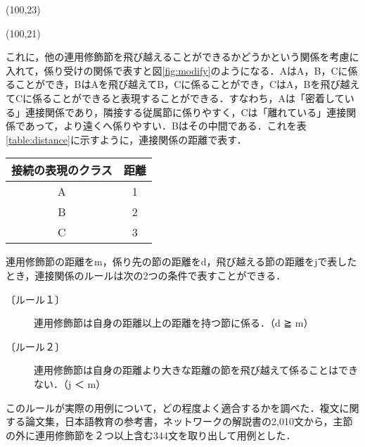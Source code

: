 \begin{figure*}
\hspace*{22mm}
\vspace*{-3mm}
\atari(100,23)
\vspace*{-3mm}
\caption{連用修飾節の包含関係}
\label{fig:imply}
\end{figure*}

\begin{figure*}
\hspace*{22mm}
\vspace*{-3mm}
\atari(100,21)
\vspace*{-3mm}
\caption{連用修飾節の係り受け}
\label{fig:modify}
\end{figure*}

これに，他の連用修飾節を飛び越えることができるかどうかという関係を考慮に入れて，係り受けの関係で表すと図\ref{fig:modify}のようになる．AはA，B，Cに係ることができ，BはAを飛び越えてB，Cに係ることができ，CはA，Bを飛び越えてCに係ることができると表現することができる．すなわち，Aは「密着している」連接関係であり，隣接する従属節に係りやすく，Cは「離れている」連接関係であって，より遠くへ係りやすい．Bはその中間である．これを表\ref{table:distance}に示すように，連接関係の距離で表す．

\begin{table*}
\caption{連接関係の距離}
\label{table:distance}
\hspace*{47mm}
\begin{tabular}{|c|c|}
\hline
\multicolumn{1}{|c|}{接続の表現のクラス} & \multicolumn{1}{c|}{距離} \\
\hline
A & 1 \\
B & 2 \\
C & 3 \\
\hline
\end{tabular}
\end{table*}
連用修飾節の距離をm，係り先の節の距離をd，飛び越える節の距離をjで表したとき，連接関係のルールは次の2つの条件で表すことができる．

\begin{description}
\item[〔ルール１〕] 連用修飾節は自身の距離以上の距離を持つ節に係る．（d ≧ m）
\item[〔ルール２〕] 連用修飾節は自身の距離より大きな距離の節を飛び越えて係ることはできない．（j ＜ m）
\end{description}

このルールが実際の用例について，どの程度よく適合するかを調べた．複文に関する論文集\cite{jinta1995}，日本語教育の参考書\cite{houjou1992}，ネットワークの解説書\cite{kaneuti1993}の2,010文から，主節の外に連用修飾節を２つ以上含む344文を取り出して用例とした．

